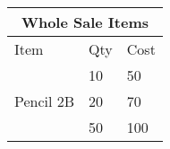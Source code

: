 \documentclass{article}
\begin{document}
	\begin{table}[h]
		\centering
		\begin{tabular}{|l|l|l|}
			\hline
			\multicolumn{3}{|c|}{Whole Sale Items}\\
			\hline
			Item & Qty & Cost\\
			\hline
			\multirow{3}{*}{Pencil 2B} & 10 & 50\\
			\cline{2-3}
			& 20 & 70\\
			\cline{2-3}
			& 50 & 100\\
			\hline
		\end{tabular}
	\end{table}
\end{document}
